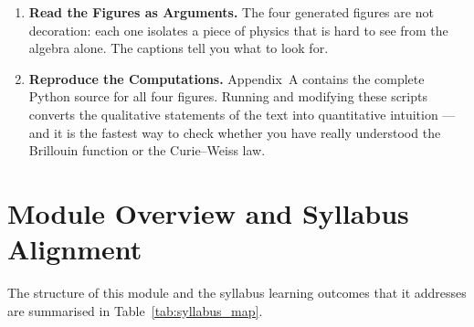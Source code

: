 \documentclass[11pt,a4paper]{article}
\begin{document}
\begin{enumerate}[leftmargin=*]
\begin{itemize}[leftmargin=1.5cm]
    \end{itemize}
    \item \textbf{Read the Figures as Arguments.} The four generated figures are not decoration: each one isolates a piece of physics that is hard to see from the algebra alone. The captions tell you what to look for.
    \item \textbf{Reproduce the Computations.} Appendix~A contains the complete Python source for all four figures. Running and modifying these scripts converts the qualitative statements of the text into quantitative intuition --- and it is the fastest way to check whether you have really understood the Brillouin function or the Curie--Weiss law.
\end{enumerate}

\vspace{0.3cm}

\section{Module Overview and Syllabus Alignment}
\label{sec:overview}

The structure of this module and the syllabus learning outcomes that it addresses are summarised in Table~\ref{tab:syllabus_map}.
\end{document}
